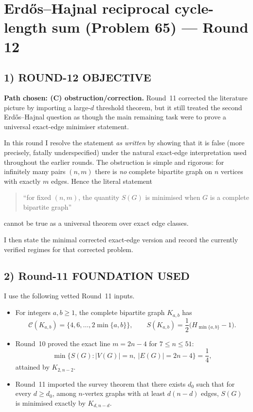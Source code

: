 \section{Erd\H{o}s--Hajnal reciprocal cycle-length sum (Problem 65) --- Round 12}

\subsection*{1) ROUND-12 OBJECTIVE}

\textbf{Path chosen: (C) obstruction/correction.}
Round~11 corrected the literature picture by importing a large-$d$ threshold theorem, but it still treated the second Erd\H{o}s--Hajnal question as though the main remaining task were to prove a universal exact-edge minimiser statement.

In this round I resolve the statement \emph{as written} by showing that it is false (more precisely, fatally underspecified) under the natural exact-edge interpretation used throughout the earlier rounds. The obstruction is simple and rigorous: for infinitely many pairs $(n,m)$ there is \emph{no} complete bipartite graph on $n$ vertices with exactly $m$ edges. Hence the literal statement
\begin{quote}
``for fixed $(n,m)$, the quantity $S(G)$ is minimised when $G$ is a complete bipartite graph''
\end{quote}
cannot be true as a universal theorem over exact edge classes.

I then state the minimal corrected exact-edge version and record the currently verified regimes for that corrected problem.

\subsection*{2) Round-11 FOUNDATION USED}

I use the following vetted Round~11 inputs.
\begin{itemize}
\item[(F1)] For integers $a,b\ge 1$, the complete bipartite graph $K_{a,b}$ has
\[
\mathcal C(K_{a,b})=\{4,6,\dots,2\min\{a,b\}\},
\qquad
S(K_{a,b})=\frac12\bigl(H_{\min\{a,b\}}-1\bigr).
\]
\item[(F2)] Round~10 proved the exact line $m=2n-4$ for $7\le n\le 51$:
\[
\min\{S(G): |V(G)|=n,\ |E(G)|=2n-4\}=\frac14,
\]
attained by $K_{2,n-2}$.
\item[(F3)] Round~11 imported the survey theorem that there exists $d_0$ such that for every $d\ge d_0$, among $n$-vertex graphs with at least $d(n-d)$ edges, $S(G)$ is minimised exactly by $K_{d,n-d}$.
\end{itemize}

